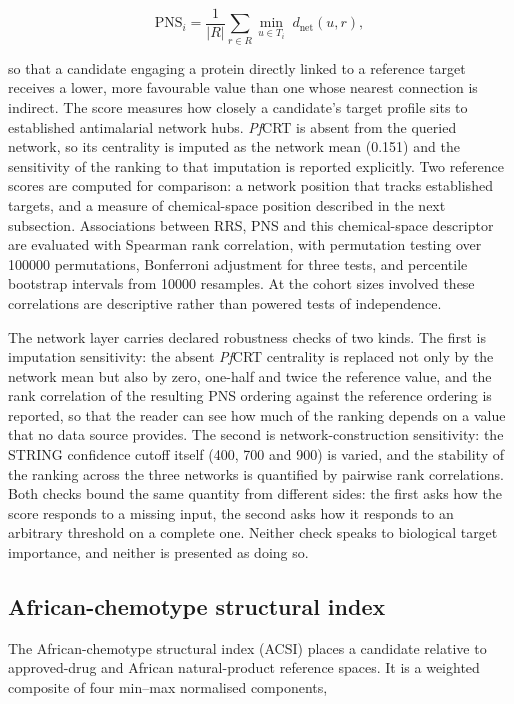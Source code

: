 \begin{equation}
\mathrm{PNS}_i = \frac{1}{|R|} \sum_{r \in R} \min_{u \in T_i} \; d_{\mathrm{net}}(u, r),
\label{eq:pns}
\end{equation}

so that a candidate engaging a protein directly linked to a reference target receives a lower, more favourable value than one whose nearest connection is indirect. The score measures how closely a candidate's target profile sits to established antimalarial network hubs. \emph{Pf}CRT is absent from the queried network, so its centrality is imputed as the network mean (\num{0.151}) and the sensitivity of the ranking to that imputation is reported explicitly. Two reference scores are computed for comparison: a network position that tracks established targets, and a measure of chemical-space position described in the next subsection. Associations between RRS, PNS and this chemical-space descriptor are evaluated with Spearman rank correlation, with permutation testing over \num{100000} permutations, Bonferroni adjustment for three tests, and percentile bootstrap intervals from \num{10000} resamples. At the cohort sizes involved these correlations are descriptive rather than powered tests of independence.

The network layer carries declared robustness checks of two kinds. The first is imputation sensitivity: the absent \emph{Pf}CRT centrality is replaced not only by the network mean but also by zero, one-half and twice the reference value, and the rank correlation of the resulting PNS ordering against the reference ordering is reported, so that the reader can see how much of the ranking depends on a value that no data source provides. The second is network-construction sensitivity: the STRING confidence cutoff itself (\num{400}, \num{700} and \num{900}) is varied, and the stability of the ranking across the three networks is quantified by pairwise rank correlations. Both checks bound the same quantity from different sides: the first asks how the score responds to a missing input, the second asks how it responds to an arbitrary threshold on a complete one. Neither check speaks to biological target importance, and neither is presented as doing so.

\subsection{African-chemotype structural index}

The African-chemotype structural index (ACSI) places a candidate relative to approved-drug and African natural-product reference spaces. It is a weighted composite of four min--max normalised components,

